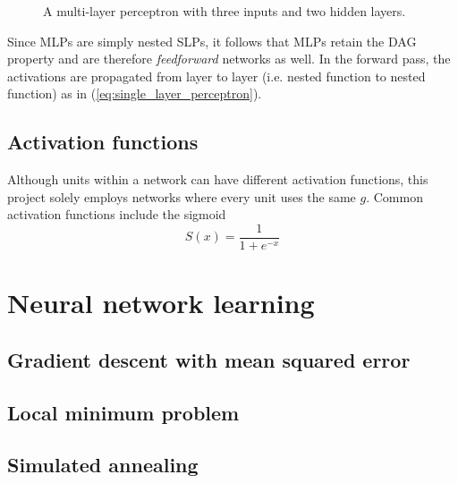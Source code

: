 \begin{figure}[h]
\begin{center}
    \end{center}
    \caption{A multi-layer perceptron with three inputs and two hidden layers.}
    \label{fig:multi_layer_perceptron}
\end{figure}

Since MLPs are simply nested SLPs, it follows that MLPs retain the DAG property and are therefore \textit{feedforward} networks as well.
In the forward pass, the activations are propagated from layer to layer (i.e. nested function to nested function) as in (\ref{eq:single_layer_perceptron}).

\section{Activation functions}
\label{sec:activation_functions}
Although units within a network can have different activation functions, this project solely employs networks where every unit uses the same $g$. 
Common activation functions include the sigmoid
\begin{equation}
    S(x) = \frac{1}{1 + e^{-x}}
\end{equation}
\todo

\chapter{Neural network learning}
\section{Gradient descent with mean squared error}
\section{Local minimum problem}
\section{Simulated annealing}

